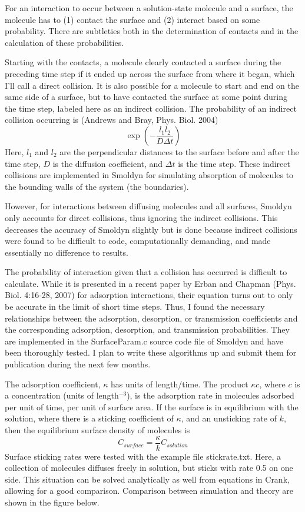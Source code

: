 \documentclass {scrbook}
\begin{document}
For an interaction to occur between a solution-state molecule and a surface, the molecule has to (1) contact the surface and (2) interact based on some probability. There are subtleties both in the determination of contacts and in the calculation of these probabilities.

Starting with the contacts, a molecule clearly contacted a surface during the preceding time step if it ended up across the surface from where it began, which I'll call a direct collision. It is also possible for a molecule to start and end on the same side of a surface, but to have contacted the surface at some point during the time step, labeled here as an indirect collision. The probability of an indirect collision occurring is (Andrews and Bray, Phys. Biol. 2004)
$$\exp\left({-\frac{l_1l_2}{D \Delta t}} \right)$$
Here, $l_1$ and $l_2$ are the perpendicular distances to the surface before and after the time step, $D$ is the diffusion coefficient, and $\Delta t$ is the time step. These indirect collisions are implemented in Smoldyn for simulating absorption of molecules to the bounding walls of the system (the boundaries).

However, for interactions between diffusing molecules and all surfaces, Smoldyn only accounts for direct collisions, thus ignoring the indirect collisions. This decreases the accuracy of Smoldyn slightly but is done because indirect collisions were found to be difficult to code, computationally demanding, and made essentially no difference to results.

The probability of interaction given that a collision has occurred is difficult to calculate. While it is presented in a recent paper by Erban and Chapman (Phys. Biol. 4:16-28, 2007) for adsorption interactions, their equation turns out to only be accurate in the limit of short time steps. Thus, I found the necessary relationships between the adsorption, desorption, or transmission coefficients and the corresponding adsorption, desorption, and transmission probabilities. They are implemented in the SurfaceParam.c source code file of Smoldyn and have been thoroughly tested. I plan to write these algorithms up and submit them for publication during the next few months.

The adsorption coefficient, $\kappa$ has units of length/time. The product $\kappa c$, where $c$ is a concentration (units of length$^{-3}$), is the adsorption rate in molecules adsorbed per unit of time, per unit of surface area. If the surface is in equilibrium with the solution, where there is a sticking coefficient of $\kappa$, and an unsticking rate of $k$, then the equilibrium surface density of molecules is
$$C_{surface} = \frac{\kappa}{k} C_{solution}$$
Surface sticking rates were tested with the example file stickrate.txt. Here, a collection of molecules diffuses freely in solution, but sticks with rate 0.5 on one side. This situation can be solved analytically as well from equations in Crank, allowing for a good comparison. Comparison between simulation and theory are shown in the figure below.
\end{document}
